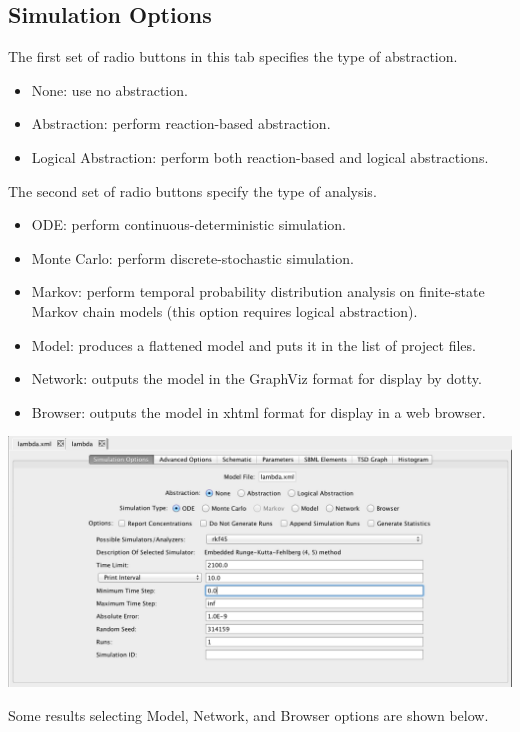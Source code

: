 \documentclass[titlepage,11pt]{article}
\begin{document}
\subsection{\label{simOptions}Simulation Options}

\noindent
The first set of radio buttons in this tab specifies the type of abstraction. 
\begin{itemize}
\item None: use no abstraction.
\item Abstraction: perform reaction-based abstraction.
\item Logical Abstraction: perform both reaction-based and logical abstractions.
\end{itemize}
The second set of radio buttons specify the type of analysis.  
\begin{itemize}
\item ODE: perform continuous-deterministic simulation.
\item Monte Carlo: perform discrete-stochastic simulation.
\item Markov: perform temporal probability distribution analysis on finite-state Markov chain models (this option requires logical abstraction).
\item Model: produces a flattened model and puts it in the list of project files.
\item Network: outputs the model in the GraphViz format for display by dotty.
\item Browser: outputs the model in xhtml format for display in a web browser.
\end{itemize}

\begin{center}
\includegraphics[width=160mm]{screenshots/analysisView}
\end{center}
 
Some results selecting Model, Network, and Browser options are shown below.
\end{document}
